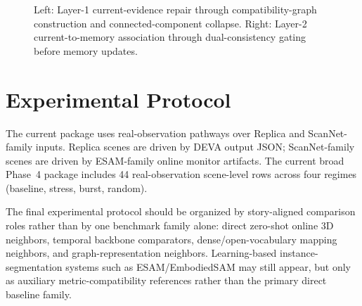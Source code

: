 \documentclass[11pt]{article}
\begin{document}
\begin{figure}[t]
\centering
\begin{minipage}{0.47\linewidth}
\centering
{}
\end{minipage}
\hfill
\begin{minipage}{0.47\linewidth}
\centering
{}
\end{minipage}
\caption{Left: Layer-1 current-evidence repair through compatibility-graph construction and connected-component collapse. Right: Layer-2 current-to-memory association through dual-consistency gating before memory updates.}
\end{figure}

\section{Experimental Protocol}
The current package uses real-observation pathways over Replica and ScanNet-family inputs. Replica scenes are driven by DEVA output JSON; ScanNet-family scenes are driven by ESAM-family online monitor artifacts. The current broad Phase~4 package includes 44 real-observation scene-level rows across four regimes (baseline, stress, burst, random).

The final experimental protocol should be organized by story-aligned comparison roles rather than by one benchmark family alone: direct zero-shot online 3D neighbors, temporal backbone comparators, dense/open-vocabulary mapping neighbors, and graph-representation neighbors. Learning-based instance-segmentation systems such as ESAM/EmbodiedSAM may still appear, but only as auxiliary metric-compatibility references rather than the primary direct baseline family.
\end{document}
